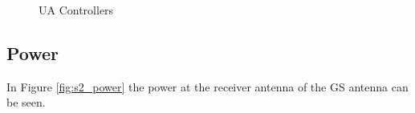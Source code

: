 \begin{figure}[H]
	\hfill
	\hfill
	\caption{UA Controllers}
	\label{fig:s1_ua}
\end{figure}

\subsection{Power}
In Figure \ref{fig:s2_power} the power at the receiver antenna of the GS antenna can be seen.

